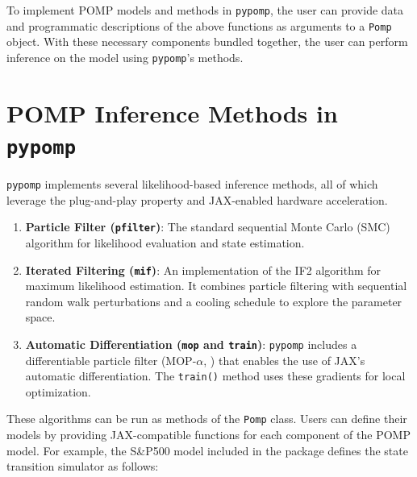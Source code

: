 \documentclass[twoside,11pt]{article}
\providecommand{\tightlist}{%
  \setlength{\itemsep}{0pt}\setlength{\parskip}{0pt}}
\begin{document}
To implement POMP models and methods in \texttt{pypomp}, the user can
provide data and programmatic descriptions of the above functions as
arguments to a \texttt{Pomp} object. With these necessary components
bundled together, the user can perform inference on the model using
\texttt{pypomp}'s methods.

\section{\texorpdfstring{POMP Inference Methods in
\texttt{pypomp}}{POMP Inference Methods in pypomp}}\label{sec-pomp-methods}

\texttt{pypomp} implements several likelihood-based inference methods,
all of which leverage the plug-and-play property \citep{ionides2006} and
JAX-enabled hardware acceleration.

\begin{enumerate}
\def\labelenumi{\arabic{enumi}.}
\tightlist
\item
  \textbf{Particle Filter (\texttt{pfilter})}: The standard sequential
  Monte Carlo (SMC) algorithm for likelihood evaluation and state
  estimation.
\item
  \textbf{Iterated Filtering (\texttt{mif})}: An implementation of the
  IF2 algorithm \citep{ionides2015} for maximum likelihood estimation.
  It combines particle filtering with sequential random walk
  perturbations and a cooling schedule to explore the parameter space.
\item
  \textbf{Automatic Differentiation (\texttt{mop} and \texttt{train})}:
  \texttt{pypomp} includes a differentiable particle filter
  (MOP-\(\alpha\), \citet{tan2024}) that enables the use of JAX's
  automatic differentiation. The \texttt{train()} method uses these
  gradients for local optimization.
\end{enumerate}

These algorithms can be run as methods of the \texttt{Pomp} class. Users
can define their models by providing JAX-compatible functions for each
component of the POMP model. For example, the S\&P500 model included in
the package defines the state transition simulator as follows:
\end{document}
